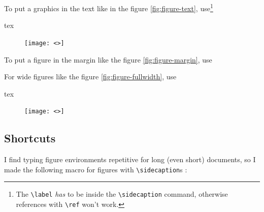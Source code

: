 To put a graphics in the text like in the figure \ref{fig:figure-text}, use\footnote{The \texttt{\textbackslash label} \textit{has} to be inside the \texttt{\textbackslash sidecaption} command, otherwise references with \texttt{\textbackslash ref} won't work.}

\begin{codebox}{tex}
    \begin{figure}
        \texttt{[image: <>]} %
    \end{figure}
\end{codebox}


To put a figure in the margin like the figure \ref{fig:figure-margin}, use



For wide figures like the figure \ref{fig:figure-fullwidth}, use

\begin{codebox}{tex}
    \begin{figure}
        \texttt{[image: <>]} %
    \end{figure}
\end{codebox}

\newpage



\subsection{Shortcuts}

I find typing figure environments repetitive for long (even short) documents, so I made the following macro for figures with \texttt{\textbackslash sidecaption}s :

